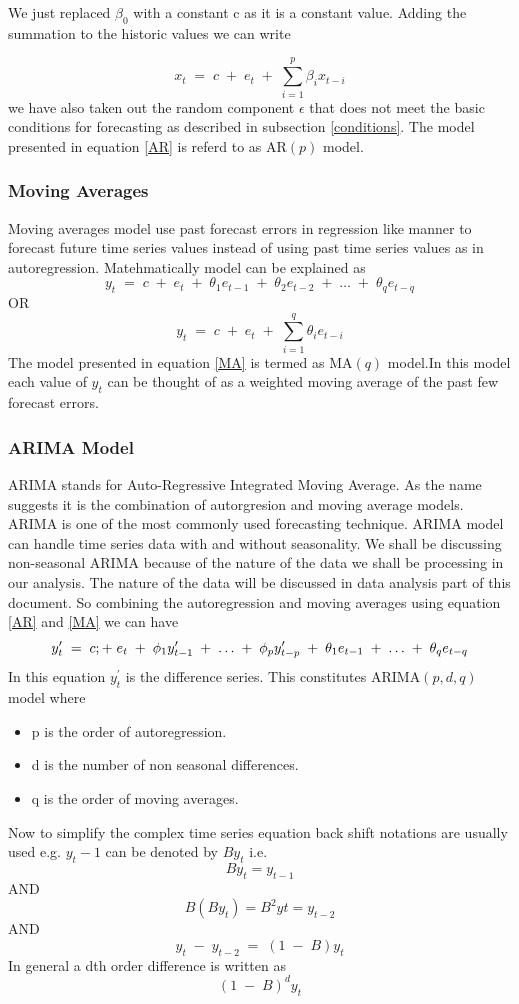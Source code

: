  We just replaced \(\beta_0\) with a constant c as it is a constant value. Adding the summation to the historic values we can write 
 
$$
x_{t}\; =\;c\;+\;e_{t}\;+\;\sum\limits_{i=1}^p\beta_{i}x_{t-i}
$$
we have also taken out the random component \(\epsilon\) that does  not meet the basic conditions for forecasting as described in subsection \ref{conditions}. The model presented  in equation \ref{AR} is referd to as AR\((p)\) model. 
\subsubsection{Moving Averages}
 Moving averages model use past forecast errors in regression like manner to forecast future time series values instead of using past time series values as in autoregression. Matehmatically model can be explained as
 \begin{equation}\label{MA}
 y_{t}\; =\;c\;+\;e_{t}\;+\;\theta_{1}e_{t-1}\;+\;\theta_{2}e_{t-2}\;+\;\dotsc\;+\;\theta_{q}e_{t-q}
\end{equation}
OR
$$
y_{t}\; =\;c\;+\;e_{t}\;+\;\sum\limits_{i=1}^q\theta_{i}e_{t-i}
$$
The model presented  in equation \ref{MA} is termed as MA\((q)\) model.In this model each value of \(y_t\) can be thought of as a weighted moving average of the past few forecast errors.
\subsubsection{ARIMA Model}
ARIMA stands for Auto-Regressive Integrated Moving Average. As the name suggests it is the combination of autorgresion and moving average models. ARIMA is one of the most commonly used forecasting technique. ARIMA model can handle time series data with and without seasonality. We shall be discussing non-seasonal ARIMA because of the nature of the data we shall be processing in our analysis. The nature of the data will be discussed in data analysis part of this document. So combining the autoregression and moving averages using equation \ref{AR} and \ref{MA} we can have 
\begin{equation}\label{ARIMA1}
 y^\prime_{t}\; =\;c\\;+\;e_{t}\;+\;\phi_{1}y^\prime_{t-1}\;+\;\dotsc\;+\;\phi_{p}y^\prime_{t-p}\;+\;\theta_{1}e_{t-1}\;+\;\dotsc\;+\;\theta_{q}e_{t-q}
\end{equation}
In this equation \(y^\prime_t\) is the difference series. This constitutes ARIMA\((p,d,q)\) model where
\begin{itemize}
\item p is the order of autoregression.
\item d is the number of non seasonal differences.
\item q is the order of moving averages.
\end{itemize}
Now to simplify the complex time series equation back shift notations are usually used e.g. \(y_t-1\) can be denoted by \(By_t\) i.e.
$$By_{t} = y_{t-1}$$
AND
$$B(By_{t}) = B^2y{t} = y_{t-2}  $$
AND 
$$ y_{t}\; -\; y_{t-2}\;=\; (1\;-\;B)y_{t}  $$
In general a dth order difference is written as 
$$ (1\;-\;B)^d y_{t} $$

